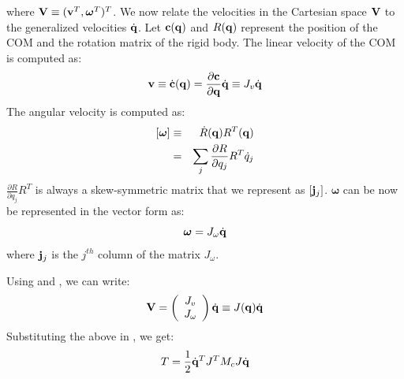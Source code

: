 where $\mathbf{V} \equiv (\mathbf{v}^T,\bm{\omega}^T)^T$. We now relate the velocities in the Cartesian space $\mathbf{V}$ to the generalized velocities $\dot{\mathbf{q}}$. Let $\mathbf{c}(\mathbf{q})$ and $R(\mathbf{q})$ represent the position of the COM and the rotation matrix of the rigid body. The linear velocity of the COM is computed as:
\begin{eqnarray}
\label{eq:vellin}
\mathbf{v} \equiv \dot{\mathbf{c}}(\mathbf{q}) = \frac{\partial \mathbf{c}}{\partial \mathbf{q}} \dot{\mathbf{q}} \equiv J_v \dot{\mathbf{q}}
\end{eqnarray}
The angular velocity is computed as:
\begin{eqnarray}
\nonumber
[\bm{\omega}] & \equiv & \dot{R}(\mathbf{q})R^T(\mathbf{q}) \\
\nonumber
& = & \sum_j \frac{\partial R}{\partial q_j}R^T \dot{q}_j
\end{eqnarray}
$\frac{\partial R}{\partial q_j}R^T$ is always a skew-symmetric matrix that we represent as $[\mathbf{j}_{j}]$. $\bm{\omega}$ can be now be represented in the vector form as:
\begin{equation}
\label{eq:velang}
\bm{\omega} = J_{\omega} \dot{\mathbf{q}}
\end{equation}
where $\mathbf{j}_{j}$ is the $j^{th}$ column of the matrix $J_{\omega}$.

Using  and , we can write:
\begin{equation}
\mathbf{V} = \left(
\begin{array}{c}
J_v \\
J_{\omega}
\end{array}
\right) \dot{\mathbf{q}} \equiv J(\mathbf{q})\dot{\mathbf{q}}
\end{equation}
Substituting the above in , we get:
\begin{equation}
T = \frac{1}{2}\dot{\mathbf{q}}^T J^T M_c J \dot{\mathbf{q}}
\end{equation}

